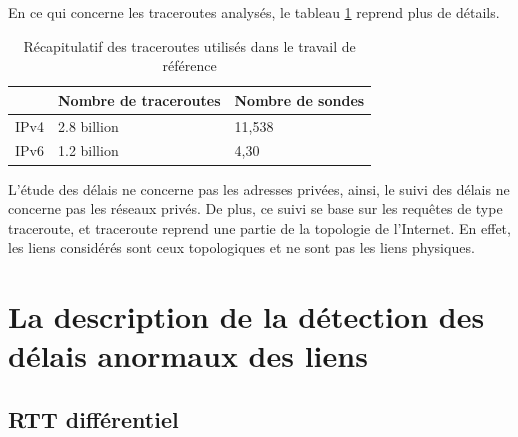 En ce qui concerne les traceroutes analysés, le tableau \ref{tab:dataset} reprend plus de détails.

\begin{table}[H]
	\centering
	\begin{tabular}{|l|l|l|}
		\hline
		& \textbf{Nombre de traceroute}s& \textbf{Nombre de sondes}\\ \hline
		IPv4		&2.8 billion & 11,538\\ \hline
		IPv6	&	1.2 billion & 4,30 \\ \hline
	\end{tabular}
	\caption{Récapitulatif des traceroutes utilisés dans le travail de référence }
	\label{tab:dataset}
\end{table}


L'étude des délais ne concerne pas  les adresses privées, ainsi, le suivi des délais ne concerne pas les réseaux privés.  De plus, ce  suivi  se base sur les requêtes de type traceroute, et traceroute reprend une partie de la topologie de l'Internet. En effet, les liens considérés sont ceux topologiques et ne sont pas  les liens physiques. 










\section{La description de la détection des délais anormaux des liens}


\subsection{RTT différentiel }~
 
